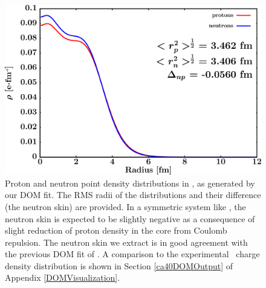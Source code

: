 \begin{figure}[tb]
    \centering
    \includegraphics[width=\textwidth]{figures/ca40_matterDensity.png}
    \caption[Proton and neutron matter density distributions in \caForty]
    {
        Proton and neutron point density distributions in \caForty, as
        generated by our DOM fit. The RMS radii of the distributions and their
        difference (the neutron skin) are provided. In a symmetric system like
        \caForty, the neutron skin is expected to be slightly negative as a
        consequence of slight reduction of proton density in the core from
        Coulomb repulsion. The neutron skin we extract is in good agreement with
        the previous DOM fit of \cite{MahzoonPhDThesis}. A comparison to the
        experimental \caForty\ charge density distribution is shown in Section
        \ref{ca40DOMOutput} of Appendix \ref{DOMVisualization}.
    }
    \label{Ca40MatterDistribution}
\end{figure}


